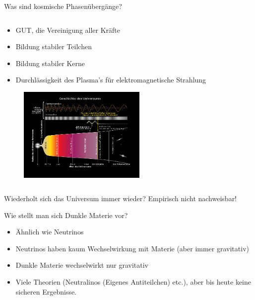 \begin{frame}{Was sind kosmische Phasenübergänge?}
   \begin{columns}
 \begin{column}{0.9\textwidth}
  \begin{itemize}
    \item  GUT, die Vereinigung aller Kräfte
    \item  Bildung stabiler Teilchen
    \item  Bildung stabiler Kerne
    \item  Durchlässigkeit des Plasma's für elektromagnetische Strahlung
  \end{itemize}
\begin{figure}
  \centering
  \includegraphics[width=0.55\textwidth]{images/Frage1.PNG}
\end{figure}
\end{column}
\end{columns}
\end{frame}


\begin{frame}{Wiederholt sich das Universum immer wieder?}
Empirisch nicht nachweisbar!
\end{frame}


\begin{frame}{Wie stellt man sich Dunkle Materie vor?}
  \begin{itemize}
    \setlength\itemsep{2em}
    \item Ähnlich wie Neutrinos
    \item Neutrinos haben kaum Wechselwirkung mit Materie (aber immer
    gravitativ)
    \item Dunkle Materie wechselwirkt nur gravitativ
    \item  Viele Theorien (Neutralinos (Eigenes Antiteilchen) etc.),
    aber bis heute keine sicheren Ergebnisse.
  \end{itemize}
\end{frame}


